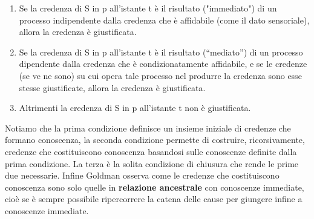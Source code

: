 \documentclass[10pt,a4paper]{article}
\begin{document}
\begin{enumerate}
	\item Se la credenza di S in p all'istante t è il risultato ("immediato") di un processo
	indipendente dalla credenza che è affidabile (come il dato sensoriale), allora la credenza è giustificata.
	\item Se la credenza di S in p all'istante t è il risultato (“mediato”) di un processo
	dipendente dalla credenza che è condizionatamente
	affidabile, e se le credenze (se ve ne sono) su cui opera tale processo nel	produrre la credenza sono esse stesse giustificate, allora la credenza è giustificata.
	\item Altrimenti la credenza di S in p all'istante t non è giustificata.
\end{enumerate}
Notiamo che la prima condizione definisce un insieme iniziale di credenze che formano conoscenza, la seconda condizione permette di costruire, ricorsivamente, credenze che costituiscono conoscenza basandosi sulle conoscenze definite dalla prima condizione. La terza è la solita condizione di chiusura che rende le prime due necessarie. Infine Goldman osserva come le credenze che costituiscono conoscenza sono solo quelle in \textbf{relazione ancestrale} con conoscenze immediate, cioè se è sempre possibile ripercorrere la catena delle cause per giungere infine a conoscenze immediate.
\end{document}
